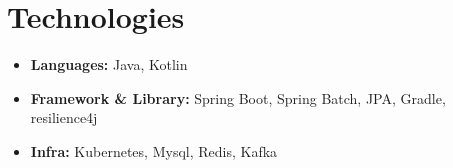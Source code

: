 \documentclass[10pt, letterpaper]{article}
\newenvironment{highlights}{
    \begin{itemize}[
        topsep=0.10 cm,
        parsep=0.10 cm,
        partopsep=0pt,
        itemsep=0pt,
        leftmargin=0.4 cm + 10pt
    ]
    }{
    \end{itemize}
} %
\begin{document}
    \section{Technologies}


    \begin{highlights}
        \item \textbf{Languages:} Java, Kotlin
    \end{highlights}

    \vspace{0.2 cm}

    \begin{highlights}
        \item \textbf{Framework \& Library:} Spring Boot, Spring Batch, JPA, Gradle, resilience4j
    \end{highlights}

    \vspace{0.2 cm}

    \begin{highlights}
        \item \textbf{Infra: } Kubernetes, Mysql, Redis, Kafka
    \end{highlights}
\end{document}
